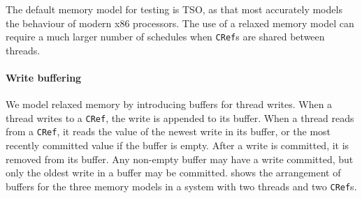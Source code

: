 The default memory model for testing is TSO, as that most accurately
models the behaviour of modern x86 processors\cite{owens2009}.  The
use of a relaxed memory model can require a much larger number of
schedules when \verb|CRef|s are shared between threads.

\paragraph{Write buffering}
We model relaxed memory by introducing buffers for thread writes.  When a thread
writes to a \verb|CRef|, the write is appended to its buffer.  When a thread
reads from a \verb|CRef|, it reads the value of the newest write in its buffer,
or the most recently committed value if the buffer is empty.  After a write is
committed, it is removed from its buffer.  Any non-empty buffer may have a write
committed, but only the oldest write in a buffer may be committed.  
shows the arrangement of buffers for the three memory models in a system with
two threads and two \verb|CRef|s.

